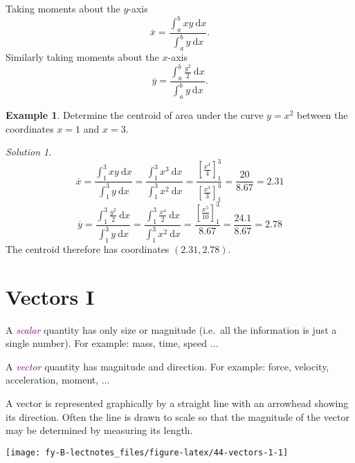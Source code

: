 \documentclass[
  english,
  11pt,
  oneside]{book}
\newcommand{\slide}{}
\theoremstyle{definition}
\theoremstyle{definition}
\newtheorem{example}{Example}[chapter]
\theoremstyle{definition}
\theoremstyle{definition}
\theoremstyle{remark}
\newtheorem*{solution}{Solution}
\begin{document}
\slide

Taking moments about the \(y\)-axis
\[
\overline x = \frac{\displaystyle\int_a^bxy\ \mathrm{d}x}{\displaystyle\int_a^b y\ \mathrm{d}x}.
\]
Similarly taking moments about the \(x\)-axis
\[
\overline y = \frac{\displaystyle\int_a^b \frac{y^2}2\ \mathrm{d}x}{\displaystyle\int_a^b y\ \mathrm{d}x}.
\]
\slide

\begin{example}
Determine the centroid of area under the curve \(y=x^2\) between the coordinates \(x=1\) and \(x=3\).
\end{example}

\begin{solution}
\[
\overline x = \frac{\displaystyle\int_1^3xy\ \mathrm{d}x}{\displaystyle\int_1^3 y\ \mathrm{d}x} = \frac{\displaystyle\int_1^3x^3\ \mathrm{d}x}{\displaystyle\int_1^3x^2\ \mathrm{d}x} = \frac{\left[\frac{x^4}{4}\right]_1^3}{\left[\frac{x^3}{3}\right]_1^3} = \frac{20}{8.67} = 2.31
\]
\[
\overline y = \frac{\displaystyle\int_1^3\frac{y^2}2\ \mathrm{d}x}{\displaystyle\int_1^3 y\ \mathrm{d}x} = \frac{\displaystyle\int_1^3\frac{x^4}2\ \mathrm{d}x}{\displaystyle\int_1^3x^2\ \mathrm{d}x} = \frac{\left[\frac{x^5}{10}\right]_1^3}{8.67} = \frac{24.1}{8.67} = 2.78
\]
The centroid therefore has coordinates \((2.31,2.78)\).
\end{solution}

\slide

\section{Vectors I}\label{vectors-i}

A \textcolor{purple}{\em scalar} quantity has only size or magnitude (i.e.~all the information is just a single number). For example: mass, time, speed \(\dots\)

A \textcolor{purple}{\em vector} quantity has magnitude and direction. For example: force, velocity, acceleration, moment, \(\dots\)

A vector is represented graphically by a straight line with an arrowhead showing its direction. Often the line is drawn to scale so that the magnitude of the vector may be determined by measuring its length.

\begin{center}\texttt{[image: fy-B-lectnotes\_files/figure-latex/44-vectors-1-1]} \end{center}
\slide
\end{document}
